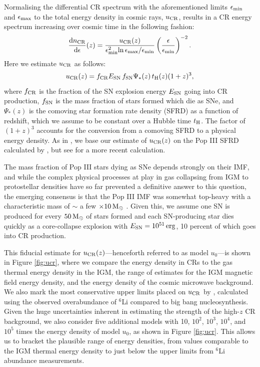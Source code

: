 \documentclass[usenatbib]{mn2e}
\newcommand{\msun}{\,{\rm M}_{\odot}}
\newcommand{\erg}{\,{\rm erg}}
\newcommand{\ucr}{{u}_{\rm \small CR}}
\newcommand{\ucrz}{{u}_{\rm \small CR}(z)}
\begin{document}
Normalising the differential CR spectrum with the aforementioned limits $\epsilon_{\rm min}$ and $\epsilon_{\rm max}$ to the total energy density in cosmic rays, $\ucr$, results in a CR energy spectrum increasing over cosmic time in the following fashion:
 \begin{equation}
 \frac{{\rm d}n_{\rm \small CR}}{{\rm d}\epsilon}(z) = \frac{u_{\rm \small CR}(z)}{\epsilon_{\rm min}^2{\rm ln}\,\epsilon_{\rm max}{\large /}\epsilon_{\rm min}}  \left( \frac{\epsilon}{\epsilon_{\rm min}} \right)^{-2}.
 \end{equation}
Here we estimate $\ucr$ as follows:
\begin{equation}
u_{\rm \small CR}(z) = f_{\rm \small CR} E_{\rm \small SN}\, f_{\rm \small SN} \Psi_{*}(z)\, t_{\rm \small H}(z) (1+z)^3,
\end{equation}
where $f_{\rm \small CR}$ is the fraction of the SN explosion energy $E_{\rm \small SN}$ going into CR production, $f_{\rm \small SN}$ is the mass fraction of stars formed which die as SNe, and $\Psi_{*}(z)$ is the comoving star formation rate density (SFRD) as a function of redshift, which we assume to be constant over a Hubble time $t_{\rm \small H}$. 
The factor of $(1+z)^3$ accounts for the conversion from a comoving SFRD to a physical energy density. As in \citet{Hummeletal2015}, we base our estimate of $u_{\rm \small CR}(z)$ on the Pop III SFRD calculated by \citet{GreifBromm2006}, but see \citet{Campisietal2011} for a more recent calculation. 

The mass fraction of Pop III stars dying as SNe depends strongly on their IMF, and while the complex physical processes at play in gas collapsing from IGM to protostellar densities have so far prevented a definitive answer to this question, the emerging consensus is that the Pop III IMF was somewhat top-heavy with a characteristic mass of $\sim$ a few $\times 10\msun$ \citep{Bromm2013}.  
Given this, we assume one SN is produced for every $50\msun$ of stars formed and each SN-producing star dies quickly as a core-collapse explosion with $E_{\rm \small SN} = 10^{51}\erg$, 10 percent of which goes into CR production.  

This fiducial estimate for $\ucrz$---henceforth referred to as model $u_0$---is shown in Figure \ref{fig:ucr}, where we compare the energy density in CRs to the gas thermal energy density in the IGM, the range of estimates for the IGM magnetic field energy density, and the energy density of the cosmic microwave background. 
We also mark the most conservative upper limits placed on $\ucr$ by \citet{RollindeVangioniOlive2006}, calculated using the observed overabundance of $^6$Li compared to big bang nucleosynthesis. 
Given the huge uncertainties inherent in estimating the strength of the high-$z$ CR background, we also consider five additional models with 10, $10^2$, $10^3$, $10^4$, and $10^5$ times the energy density of model $u_0$, as shown in Figure \ref{fig:ucr}.  
This allows us to bracket the plausible range of energy densities, from values comparable to the IGM thermal energy density to just below the upper limits from $^6$Li abundance measurements.
 
\end{document}

